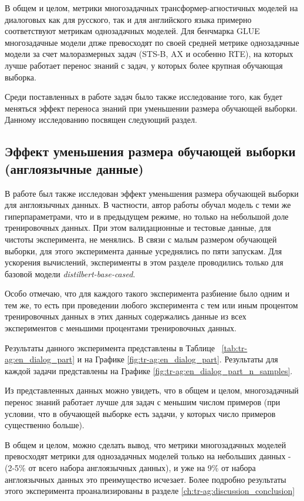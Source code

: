 В общем и целом, метрики многозадачных трансформер-агностичных моделей на диалоговых как для русского, так и для английского языка примерно соответствуют метрикам однозадачных моделей. 
 Для бенчмарка GLUE многозадачные модели дпже превосходят по своей средней метрике однозадачные модели за счет малоразмерных задач (STS-B, AX и особенно RTE), на которых лучше работает перенос знаний с задач, у которых более крупная обучающая выборка. 

Среди поставленных в работе задач было также исследование того, как будет меняться эффект переноса знаний при уменьшении размера обучающей выборки. Данному исследованию посвящен следующий раздел. 

\subsection{Эффект уменьшения размера обучающей выборки (англоязычные данные)}
В работе был также исследован эффект уменьшения размера обучающей выборки для англоязычных данных. В частности, автор работы обучал модель с теми же гиперпараметрами, что и в предыдущем режиме, но только на небольшой доле тренировочных данных. При этом валидационные и тестовые данные, для чистоты эксперимента, не менялись. В связи с малым размером обучающей выборки, для этого эксперимента данные усреднялись по пяти запускам. Для ускорения вычислений, эксперименты в этом разделе проводились только для базовой модели \textit{distilbert-base-cased}. 

Особо отмечаю, что для каждого такого эксперимента разбиение было одним и тем же, то есть при проведении любого эксперимента с тем или иным процентом тренировочных данных в этих данных содержались данные из всех экспериментов с меньшими процентами тренировочных данных. 

Результаты данного эксперимента представлены в Таблице ~\ref{tab:tr-ag:en_dialog_part} и на Графике \ref{fig:tr-ag:en_dialog_part}. Результаты для каждой задачи представлены на Графике  \ref{fig:tr-ag:en_dialog_part_n_samples}. %

Из представленных данных можно увидеть, что в общем и целом, многозадачный перенос знаний работает лучше для задач с меньшим числом примеров (при условии, что в обучающей выборке есть задачи, у которых число примеров существенно больше). 

В общем и целом, можно сделать вывод, что метрики многозадачных моделей превосходят метрики для однозадачных моделей только на небольших данных -(2-5\% от всего набора англоязычных данных), и уже на 9\% от набора англоязычных данных это преимущество исчезает. Более подробно результаты этого эксперимента проанализированы в разделе \ref{ch:tr-ag:discussion_conclusion}

